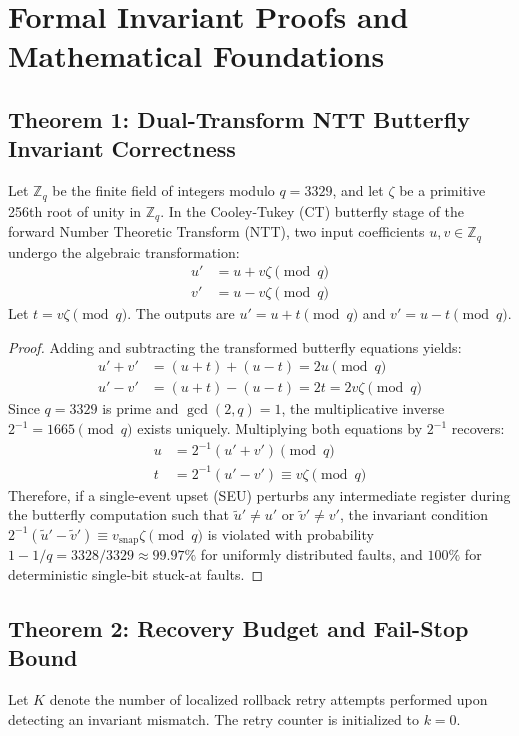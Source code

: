 \section{Formal Invariant Proofs and Mathematical Foundations}
\label{sec:supp_math_proofs}

\subsection{Theorem 1: Dual-Transform NTT Butterfly Invariant Correctness}
Let $\mathbb{Z}_q$ be the finite field of integers modulo $q = 3329$, and let $\zeta$ be a primitive 256th root of unity in $\mathbb{Z}_q$. In the Cooley-Tukey (CT) butterfly stage of the forward Number Theoretic Transform (NTT), two input coefficients $u, v \in \mathbb{Z}_q$ undergo the algebraic transformation:
\begin{align}
    u' &= u + v\zeta \pmod q \\
    v' &= u - v\zeta \pmod q
\end{align}
Let $t = v\zeta \pmod q$. The outputs are $u' = u + t \pmod q$ and $v' = u - t \pmod q$.

\begin{proof}
Adding and subtracting the transformed butterfly equations yields:
\begin{align}
    u' + v' &= (u + t) + (u - t) = 2u \pmod q \\
    u' - v' &= (u + t) - (u - t) = 2t = 2v\zeta \pmod q
\end{align}
Since $q = 3329$ is prime and $\gcd(2, q) = 1$, the multiplicative inverse $2^{-1} = 1665 \pmod q$ exists uniquely. Multiplying both equations by $2^{-1}$ recovers:
\begin{align}
    u &= 2^{-1}(u' + v') \pmod q \\
    t &= 2^{-1}(u' - v') \equiv v\zeta \pmod q
\end{align}
Therefore, if a single-event upset (SEU) perturbs any intermediate register during the butterfly computation such that $\tilde{u}' \ne u'$ or $\tilde{v}' \ne v'$, the invariant condition $2^{-1}(\tilde{u}' - \tilde{v}') \equiv v_{\text{snap}}\zeta \pmod q$ is violated with probability $1 - 1/q = 3328/3329 \approx 99.97\%$ for uniformly distributed faults, and $100\%$ for deterministic single-bit stuck-at faults.
\end{proof}

\subsection{Theorem 2: Recovery Budget and Fail-Stop Bound}
Let $K$ denote the number of localized rollback retry attempts performed upon detecting an invariant mismatch. The retry counter is initialized to $k = 0$.

